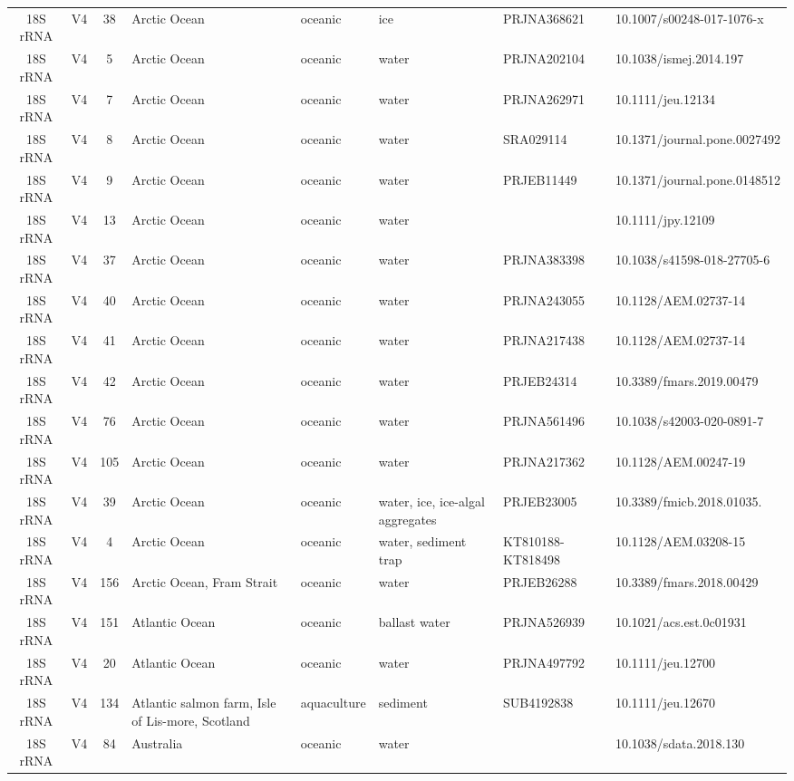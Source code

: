 \begin{longtable}{ccclllll}
  18S rRNA & V4 & 38 & Arctic Ocean & oceanic & ice & PRJNA368621 & 10.1007/s00248-017-1076-x \\ 
  18S rRNA & V4 & 5 & Arctic Ocean & oceanic & water & PRJNA202104 & 10.1038/ismej.2014.197 \\ 
  18S rRNA & V4 & 7 & Arctic Ocean & oceanic & water & PRJNA262971 & 10.1111/jeu.12134 \\ 
  18S rRNA & V4 & 8 & Arctic Ocean & oceanic & water & SRA029114 & 10.1371/journal.pone.0027492 \\ 
  18S rRNA & V4 & 9 & Arctic Ocean & oceanic & water & PRJEB11449 & 10.1371/journal.pone.0148512 \\ 
  18S rRNA & V4 & 13 & Arctic Ocean & oceanic & water &  & 10.1111/jpy.12109 \\ 
  18S rRNA & V4 & 37 & Arctic Ocean & oceanic & water & PRJNA383398 & 10.1038/s41598-018-27705-6 \\ 
  18S rRNA & V4 & 40 & Arctic Ocean & oceanic & water & PRJNA243055 & 10.1128/AEM.02737-14 \\ 
  18S rRNA & V4 & 41 & Arctic Ocean & oceanic & water & PRJNA217438 & 10.1128/AEM.02737-14 \\ 
  18S rRNA & V4 & 42 & Arctic Ocean & oceanic & water & 	PRJEB24314 & 10.3389/fmars.2019.00479 \\ 
  18S rRNA & V4 & 76 & Arctic Ocean & oceanic & water & PRJNA561496 & 10.1038/s42003-020-0891-7 \\ 
  18S rRNA & V4 & 105 & Arctic Ocean & oceanic & water & PRJNA217362 & 10.1128/AEM.00247-19 \\ 
  18S rRNA & V4 & 39 & Arctic Ocean & oceanic & water, ice, ice-algal aggregates & PRJEB23005 & 10.3389/fmicb.2018.01035. \\ 
  18S rRNA & V4 & 4 & Arctic Ocean & oceanic & water, sediment trap & KT810188-KT818498 & 10.1128/AEM.03208-15 \\ 
  18S rRNA & V4 & 156 & Arctic Ocean, Fram Strait & oceanic & water & PRJEB26288 & 10.3389/fmars.2018.00429 \\ 
  18S rRNA & V4 & 151 & Atlantic Ocean & oceanic & ballast water & PRJNA526939 & 10.1021/acs.est.0c01931 \\ 
  18S rRNA & V4 & 20 & Atlantic Ocean & oceanic & water & PRJNA497792 & 10.1111/jeu.12700 \\ 
  18S rRNA & V4 & 134 & Atlantic salmon farm, Isle of Lis-more, Scotland & aquaculture & sediment & SUB4192838 & 10.1111/jeu.12670 \\ 
  18S rRNA & V4 & 84 & Australia & oceanic & water &  & 10.1038/sdata.2018.130 \\ 

\end{longtable}
